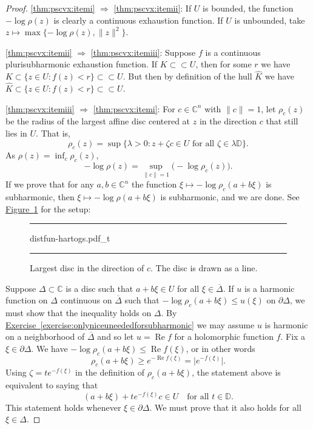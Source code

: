 \documentclass[12pt,openany]{book}
\renewcommand{\Re}{\operatorname{Re}}
\newcommand{\snorm}[1]{\lVert {#1} \rVert}
\newcommand{\babs}[1]{\bigl\lvert {#1} \bigr\rvert}
\newcommand{\C}{{\mathbb{C}}}
\newcommand{\D}{{\mathbb{D}}}
\theoremstyle{plain}
\theoremstyle{remark}
\theoremstyle{definition}
\newenvironment{myfig}{%
\begin{figure}[h!t]
\noindent\rule{\textwidth}{0.5pt}\vspace{12pt}\par\centering}%
{\par\noindent\rule{\textwidth}{0.5pt}
\end{figure}}
\theoremstyle{exercise}
\theoremstyle{example}
\newcommand{\figureref}[1]{\hyperref[#1]{Figure~\ref*{#1}}}
\newcommand{\exerciseref}[1]{\hyperref[#1]{Exercise~\ref*{#1}}}
\begin{document}
\begin{proof}
\ref{thm:pscvx:itemi}
$\Rightarrow$
\ref{thm:pscvx:itemii}:
If $U$ is bounded,
the function $-\log \rho(z)$ is clearly a continuous exhaustion function.
If $U$ is unbounded, take 
$z \mapsto \max \{ -\log \rho(z) , \snorm{z}^2 \}$.

\ref{thm:pscvx:itemii}
$\Rightarrow$
\ref{thm:pscvx:itemiii}:
Suppose $f$ is a continuous plurisubharmonic exhaustion function.
If $K \subset \subset U$, then for some $r$ we have
$K \subset \{ z \in U : f(z) < r \} \subset \subset U$.
But then by definition of the hull $\widehat{K}$ we have
$\widehat{K} \subset \{ z \in U : f(z) < r \} \subset \subset U$.

\ref{thm:pscvx:itemiii}
$\Rightarrow$
\ref{thm:pscvx:itemi}:
For $c \in \C^n$ with $\snorm{c}=1$, let
$\rho_c(z)$ be the radius of the largest affine disc centered at $z$
in the direction $c$ that still lies in $U$.  That is,
\begin{equation*}
\rho_c(z) =
\sup \bigl\{ \lambda > 0 :
z+ \zeta c \in U \text{ for all $\zeta \in \lambda\D$} \bigr\} .
\end{equation*}
As $\rho(z) = \inf_c \rho_c(z)$,
\begin{equation*}
- \log \rho(z) = \sup_{\snorm{c}=1} \bigl(-\log \rho_c(z)\bigr) .
\end{equation*}
If we prove that for any $a, b \in \C^n$ the function $\xi \mapsto -\log \rho_c(a+b\xi)$ is
subharmonic, then $\xi \mapsto - \log \rho(a+b\xi)$ is subharmonic,
and we are done.
See \figureref{fig:distfun-hartogs} for the setup:
\begin{myfig}
{distfun-hartogs.pdf_t}
\caption{Largest disc in the direction of $c$.
The disc is drawn as a line.\label{fig:distfun-hartogs}}
\end{myfig}

Suppose $\Delta \subset \C$ is a disc such that
$a+b\xi \in U$
for all $\xi \in
\overline{\Delta}$.
If $u$ is a harmonic function on $\Delta$ continuous on $\overline{\Delta}$
such that
$- \log \rho_c(a+b\xi) \leq u(\xi)$ on $\partial \Delta$, we must
show that 
the inequality holds on $\Delta$.
By \exerciseref{exercise:onlyniceuneededforsubharmonic}
we may assume $u$ is harmonic on a neighborhood of $\overline{\Delta}$
and so let $u = \Re f$ for a holomorphic function $f$.
Fix a $\xi \in \partial \Delta$.  We have  $- \log \rho_c(a+b\xi) \leq \Re
f(\xi)$,
or in other words
\begin{equation*}
\rho_c(a+b\xi) \geq e^{-\Re f(\xi)} = \babs{e^{-f(\xi)}}.
\end{equation*}
Using $\zeta = t e^{-f(\xi)}$ in the definition of $\rho_c(a+b\xi)$, the statement above is equivalent
to saying that 
\begin{equation*}
(a+b\xi)+te^{-f(\xi)}c \in U \quad \text{for all $t \in \D$}.
\end{equation*}
This statement holds whenever $\xi \in \partial \Delta$.  We must prove that
it also holds for all $\xi \in \Delta$.


\end{proof}
\end{document}
